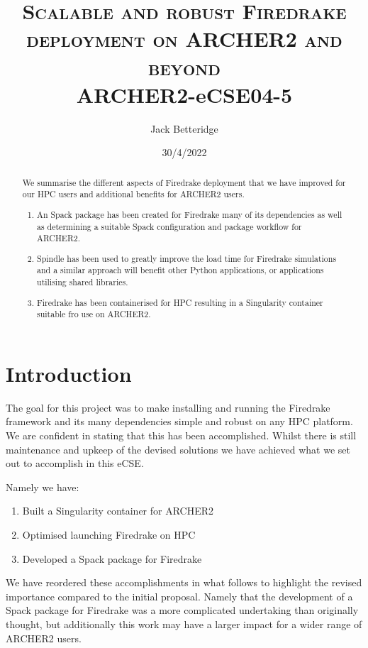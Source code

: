 \documentclass[a4paper,11pt]{article}
\title{\textsc{Scalable and robust Firedrake deployment on ARCHER2 and beyond}\\
\Large ARCHER2-eCSE04-5}
\author{Jack Betteridge}
\date{30/4/2022}
\begin{document}
\maketitle

\begin{abstract}
	We summarise the different aspects of Firedrake deployment that we have improved for our HPC users and additional benefits for ARCHER2 users.
	\begin{enumerate}
	\item An Spack package has been created for Firedrake many of its dependencies as well as determining a suitable Spack configuration and package workflow for ARCHER2.
	\item Spindle has been used to greatly improve the load time for Firedrake simulations and a similar approach will benefit other Python applications, or applications utilising shared libraries.
	\item Firedrake has been containerised for HPC resulting in a Singularity container suitable fro use on ARCHER2.
\end{enumerate}
\end{abstract}

\section{Introduction}
\label{sec:intro}
The goal for this project was to make installing and running the Firedrake framework and its many dependencies simple and robust on any HPC platform.
We are confident in stating that this has been accomplished.
Whilst there is still maintenance and upkeep of the devised solutions we have achieved what we set out to accomplish in this eCSE.

Namely we have:
\begin{enumerate}
	\item Built a Singularity container for ARCHER2
	\item Optimised launching Firedrake on HPC
	\item Developed a Spack package for Firedrake
\end{enumerate} 

We have reordered these accomplishments in what follows to highlight the revised importance compared to the initial proposal.
Namely that the development of a Spack package for Firedrake was a more complicated undertaking than originally thought, but additionally this work may have a larger impact for a wider range of ARCHER2 users.
\end{document}
